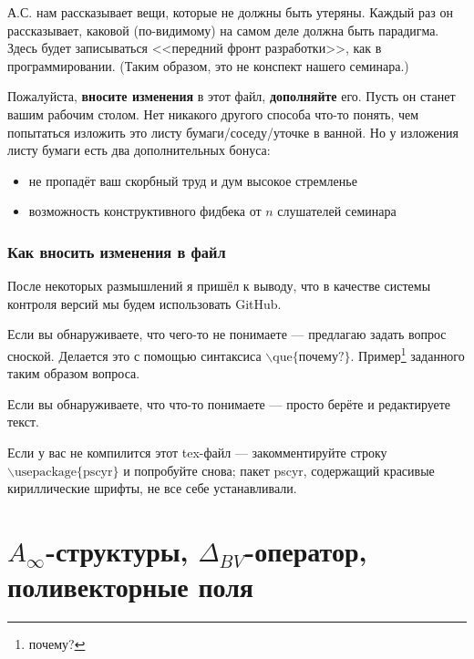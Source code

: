 \documentclass[11pt]{article}
\theoremstyle{remark}
\theoremstyle{definition}
\newcommand{\que}[1]{\footnote{\textcolor[rgb]{0.38,0.69,0.82}{#1}}}
\begin{document}
\baselineskip14pt
\bigskip


\tableofcontents
\bigskip
\bigskip


А.С. нам рассказывает вещи, которые не должны быть утеряны. Каждый раз он рассказывает, каковой (по-видимому) на самом деле должна быть парадигма. Здесь будет записываться <<передний фронт разработки>>, как в программировании. (Таким образом, это не конспект нашего семинара.)

Пожалуйста, \textbf{вносите изменения} в этот файл, \textbf{дополняйте} его. Пусть он станет вашим рабочим столом. Нет никакого другого способа что-то понять, чем попытаться изложить это листу бумаги/соседу/уточке в ванной. Но у изложения листу бумаги есть два дополнительных бонуса:
\begin{itemize}
  \item не пропадёт ваш скорбный труд и дум высокое стремленье
  \item возможность конструктивного фидбека от $n$ слушателей семинара
\end{itemize}

\subsubsection{Как вносить изменения в файл}

После некоторых размышлений я пришёл к выводу, что в качестве системы контроля версий мы будем использовать GitHub.

Если вы обнаруживаете, что чего-то не понимаете --- предлагаю задать вопрос сноской. Делается это с помощью синтаксиса $\backslash \text{que} \{ \text{почему?} \}$. Пример\que{почему?} заданного таким образом вопроса.

Если вы обнаруживаете, что что-то понимаете --- просто берёте и редактируете текст.

Если у вас не компилится этот tex-файл --- закомментируйте строку $\backslash\text{usepackage}\{ \text{pscyr} \}$ и попробуйте снова; пакет pscyr, содержащий красивые кириллические шрифты, не все себе устанавливали.

\newpage




\section{$A_{\infty}$-структуры, $\Delta_{BV}$-оператор, поливекторные поля}
\end{document}
